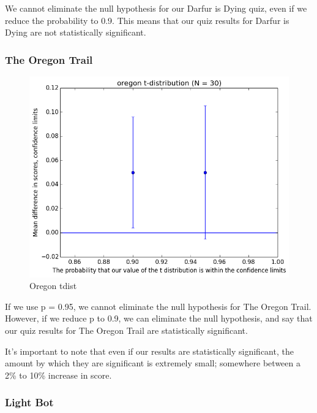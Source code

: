 				We cannot eliminate the null hypothesis for our Darfur is Dying quiz, even if we reduce the probability to 0.9. This means that our quiz results for Darfur is Dying are not statistically significant.

			\subsubsection{The Oregon Trail}

				\begin{figure}[] 
					\centering 
					\includegraphics[width=\textwidth, height=.4\textheight, keepaspectratio=true]{oregon_tdist.png} 
					\caption{Oregon tdist}
				\end{figure}

				If we use p = 0.95, we cannot eliminate the null hypothesis for The Oregon Trail. However, if we reduce p to 0.9, we can eliminate the null hypothesis, and say that our quiz results for The Oregon Trail are statistically significant.

				It's important to note that even if our results are statistically significant, the amount by which they are significant is extremely small; somewhere between a 2\% to 10\% increase in score.

			\subsubsection{Light Bot}

